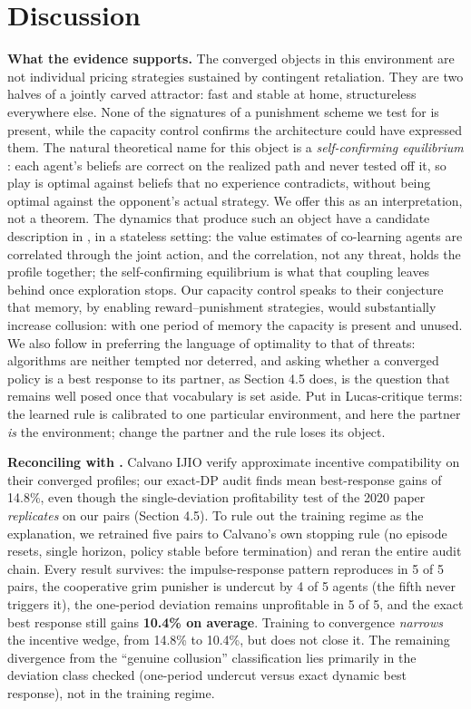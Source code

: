 \documentclass[sigconf]{acmart}
\begin{document}
\section{Discussion}\label{discussion}

\textbf{What the evidence supports.} The converged objects in this
environment are not individual pricing strategies sustained by
contingent retaliation. They are two halves of a jointly carved
attractor: fast and stable at home, structureless everywhere else. None
of the signatures of a punishment scheme we test for is present, while
the capacity control confirms the architecture could have expressed
them. The natural theoretical name for this object is a
\emph{self-confirming equilibrium} \citep{fudenberg1993}: each agent's
beliefs are correct on the realized path and never tested off it, so
play is optimal against beliefs that no experience contradicts, without
being optimal against the opponent's actual strategy. We offer this as
an interpretation, not a theorem. The dynamics that produce such an
object have a candidate description in \citet{banchio2022}, in a
stateless setting: the value estimates of co-learning agents are
correlated through the joint action, and the correlation, not any
threat, holds the profile together; the self-confirming equilibrium is
what that coupling leaves behind once exploration stops. Our capacity
control speaks to their conjecture that memory, by enabling
reward--punishment strategies, would substantially increase collusion:
with one period of memory the capacity is present and unused. We also
follow \citet{denboer2022} in preferring the language of optimality to
that of threats: algorithms are neither tempted nor deterred, and asking
whether a converged policy is a best response to its partner, as Section
4.5 does, is the question that remains well posed once that vocabulary
is set aside. Put in Lucas-critique terms: the learned rule is
calibrated to one particular environment, and here the partner \emph{is}
the environment; change the partner and the rule loses its object.

\textbf{Reconciling with \citet{calvano2023}.} Calvano IJIO verify
approximate incentive compatibility on their converged profiles; our
exact-DP audit finds mean best-response gains of 14.8\%, even though the
single-deviation profitability test of the 2020 paper \emph{replicates}
on our pairs (Section 4.5). To rule out the training regime as the
explanation, we retrained five pairs to Calvano's own stopping rule (no
episode resets, single horizon, policy stable before termination) and
reran the entire audit chain. Every result survives: the
impulse-response pattern reproduces in 5 of 5 pairs, the cooperative
grim punisher is undercut by 4 of 5 agents (the fifth never triggers
it), the one-period deviation remains unprofitable in 5 of 5, and the
exact best response still gains \textbf{10.4\% on average}. Training to
convergence \emph{narrows} the incentive wedge, from 14.8\% to 10.4\%,
but does not close it. The remaining divergence from the ``genuine
collusion'' classification lies primarily in the deviation class checked
(one-period undercut versus exact dynamic best response), not in the
training regime.
\end{document}
